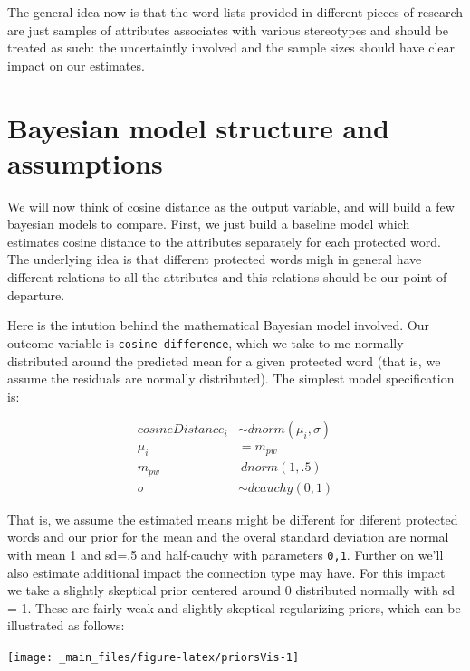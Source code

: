 \documentclass[12pt,]{book}
\begin{document}
The general idea now is that the word lists provided in different pieces
of research are just samples of attributes associates with various
stereotypes and should be treated as such: the uncertaintly involved and
the sample sizes should have clear impact on our estimates.

\section{Bayesian model structure and
assumptions}\label{bayesian-model-structure-and-assumptions}

We will now think of cosine distance as the output variable, and will
build a few bayesian models to compare. First, we just build a baseline
model which estimates cosine distance to the attributes separately for
each protected word. The underlying idea is that different protected
words migh in general have different relations to all the attributes and
this relations should be our point of departure.

Here is the intution behind the mathematical Bayesian model involved.
Our outcome variable is \texttt{cosine\ difference}, which we take to me
normally distributed around the predicted mean for a given protected
word (that is, we assume the residuals are normally distributed). The
simplest model specification is:

\begin{align}
cosineDistance_i  & \sim dnorm(\mu_i, \sigma) \\
\mu_i & = m_{pw} \\
m_{pw} & ~ dnorm(1,.5) \\
\sigma &\sim  dcauchy(0,1)
\end{align}

That is, we assume the estimated means might be different for diferent
protected words and our prior for the mean and the overal standard
deviation are normal with mean 1 and sd=.5 and half-cauchy with
parameters \texttt{0,1}. Further on we'll also estimate additional
impact the connection type may have. For this impact we take a slightly
skeptical prior centered around 0 distributed normally with sd = 1.
These are fairly weak and slightly skeptical regularizing priors, which
can be illustrated as follows:

\vspace{2mm}

\begin{center}\texttt{[image: \_main\_files/figure-latex/priorsVis-1]} \end{center}
\end{document}
